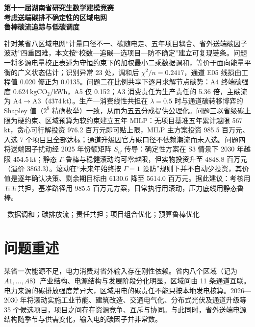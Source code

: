 \documentclass[UTF8,a4paper,zihao=-4,fontset=fandol]{ctexart}
\begin{document}
\begin{center}
{\heiti{}\bfseries 第十一届湖南省研究生数学建模竞赛}\\[1.4em]
{\heiti{}\bfseries 考虑送端碳排不确定性的区域电网}\\[0.35em]
{\heiti{}\bfseries 鲁棒碳流追踪与低碳调度}
\end{center}
\vspace{1.1em}

\quad
针对某省八区域电网“计量口径不一、碳随电走、五年项目耦合、省外送端碳因子波动”四重困难，本文按“校数—追碳—选项目—防不确定”建立可复现链条。问题一将多源电量校正表述为守恒约束下的加权最小二乘数据调和，等价于面向能量平衡的广义状态估计；识别异常 23 处，调和后 $\chi^2/n=0.2417$，通道 E05 线损由工程值 0.020 修正为 0.0135。问题二在比例共享下逐月求解节点碳势：A4 终端碳强度 0.624\,kgCO$_2$/kWh，A5 仅 0.152；A3 消费责任为生产责任的 5.36 倍，主碳流为 A4$\to$A3（4374\,kt）。生产—消费线性共担在 $\lambda=0.5$ 时与通道碳转移博弈的 Shapley 值（$2^8$ 精确枚举）一致，从而为五五分成提供公理化。问题三以省级碳上限为硬约束、区域预算为软约束建立五年 MILP：无项目基准五年累计越限 567\,kt，贪心可行解投资 976.2 百万元即可贴上限，MILP 主方案投资 985.5 百万元、入选 7 个项目且全部达标；通道升级因官方碳口径不依赖潮流而未入选。问题四将送端因子扰动经 2025 年份额矩阵 $S_{ij}$ 传导：确定性方案在 S3 情景下 2030 年越限 454.5\,kt；静态 $\Gamma$-鲁棒与稳健滚动均可零越限，但实物投资升至 4848.8 百万元（溢价 3863.3）。滚动在“未来年始终按 $\Gamma=1$ 设防”规则下并不自动少投资，其价值是逐年确认决策、剩余期目标由 6130.6 降至 5614.0 百万元。据此建议：考核用五五共担，基准路径用 985.5 百万元方案，日常执行用滚动，压力底线用静态鲁棒。

\vspace{0.6em}
\ 数据调和；碳排放流；责任共担；项目组合优化；预算鲁棒优化

\newpage

\section{问题重述}

某省一次能源不足，电力消费对省外输入存在刚性依赖。省内八个区域（记为 $A1,\ldots,A8$）产业结构、电源结构与发展阶段分化明显，区域间由 11 条通道互联。电力来源的碳排放强度差异大，区域用电的碳责任不能只按本地发电核算。2026—2030 年将滚动实施工业节能、建筑改造、交通电气化、分布式光伏及通道升级等 35 个候选项目，项目之间存在资源竞争、互斥与协同。与此同时，省外送端电源结构随季节与供需变化，输入电的碳因子并非常数。
\end{document}
